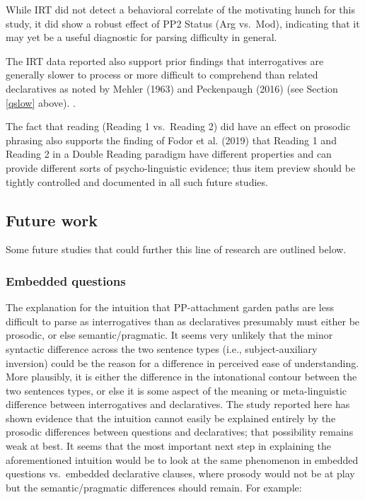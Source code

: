 \documentclass[11pt,oneside]{book}
\begin{document}
While IRT did not detect a behavioral correlate of the motivating hunch for this study, it did show a robust effect of PP2 Status (Arg vs.~Mod), indicating that it may yet be a useful diagnostic for parsing difficulty in general.

The IRT data reported also support prior findings that interrogatives are generally slower to process or more difficult to comprehend than related declaratives as noted by Mehler (1963) and Peckenpaugh (2016) (see Section \ref{qslow} above). .

The fact that reading (Reading 1 vs.~Reading 2) did have an effect on prosodic phrasing also supports the finding of Fodor et al. (2019) that Reading 1 and Reading 2 in a Double Reading paradigm have different properties and can provide different sorts of psycho-linguistic evidence; thus item preview should be tightly controlled and documented in all such future studies.

\hypertarget{future-work}{%
\subsection{Future work}\label{future-work}}

Some future studies that could further this line of research are outlined below.

\hypertarget{embedded-questions}{%
\subsubsection{Embedded questions}\label{embedded-questions}}

The explanation for the intuition that PP-attachment garden paths are less difficult to parse as interrogatives than as declaratives presumably must either be prosodic, or else semantic/pragmatic. It seems very unlikely that the minor syntactic difference across the two sentence types (i.e., subject-auxiliary inversion) could be the reason for a difference in perceived ease of understanding. More plausibly, it is either the difference in the intonational contour between the two sentences types, or else it is some aspect of the meaning or meta-linguistic difference between interrogatives and declaratives. The study reported here has shown evidence that the intuition cannot easily be explained entirely by the prosodic differences between questions and declaratives; that possibility remains weak at best. It seems that the most important next step in explaining the aforementioned intuition would be to look at the same phenomenon in embedded questions vs.~embedded declarative clauses, where prosody would not be at play but the semantic/pragmatic differences should remain. For example:
\end{document}
